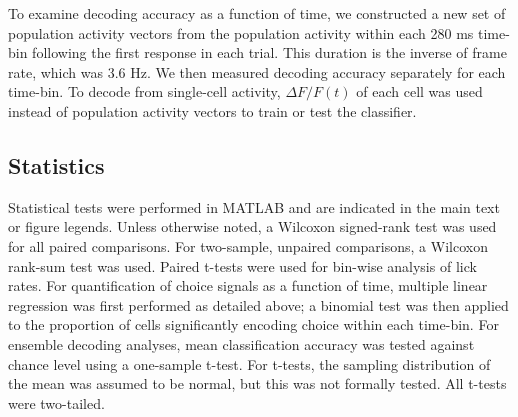 To examine decoding accuracy as a function of time, we constructed a new set of population activity vectors from the population activity within each 280 ms time-bin following the first response in each trial. This duration is the inverse of frame rate, which was 3.6 Hz. We then measured decoding accuracy separately for each time-bin. To decode from single-cell activity, $\Delta F/F (t)$ of each cell was used instead of population activity vectors to train or test the classifier.

\subsection*{Statistics}
Statistical tests were performed in MATLAB and are indicated in the main text or figure legends. Unless otherwise noted, a Wilcoxon signed-rank test was used for all paired comparisons. For two-sample, unpaired comparisons, a Wilcoxon rank-sum test was used. Paired t-tests were used for bin-wise analysis of lick rates. For quantification of choice signals as a function of time, multiple linear regression was first performed as detailed above; a binomial test was then applied to the proportion of cells significantly encoding choice within each time-bin. For ensemble decoding analyses, mean classification accuracy was tested against chance level using a one-sample t-test. For t-tests, the sampling distribution of the mean was assumed to be normal, but this was not formally tested. All t-tests were two-tailed.